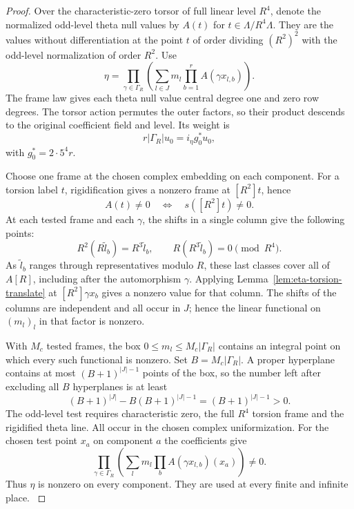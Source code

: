 \begin{proof}
Over the characteristic-zero torsor of full linear level \(R^4\), denote the
normalized odd-level theta null values by \(A(t)\) for
\(t\in\Lambda/R^4\Lambda\). They are the values without differentiation at the point \(t\) of order dividing \((R^2)^2\)
with the odd-level normalization of order \(R^2\). Use
\begin{equation}\label{eq:selected-eta-product}
 \eta=\prod_{\gamma\in\Gamma_R}
             \left(\sum_{l\in J}m_l
                       \prod_{b=1}^{r}A(\gamma x_{l,b})\right).
\end{equation}
The frame law gives each theta null value central degree one
and zero row degrees. The torsor action permutes the outer
factors, so their product descends to the original coefficient
field and level. Its weight is 
\[
  r|\Gamma_R|u_0=i_\eta g_0^*u_0,
\]
with \(g_0^*=2\cdot5^4r\).
\label{cor:selected-auxiliary-cusp-2}

Choose one frame at the chosen complex embedding on each
component. For a torsion label \(t\), rigidification gives a nonzero frame
at \([R^2]t\), hence
\[
 A(t)\ne0\quad\Longleftrightarrow\quad s([R^2]t)\ne0.
\] At each tested frame and each \(\gamma\),
the shifts in a single column give the following points:
\[
  R^2(R\widetilde l_b)=R^3\widetilde l_b,\qquad R(R^3\widetilde l_b)=0\pmod{R^4}.
\]
As \(\widetilde l_b\) ranges through representatives modulo \(R\),
these last classes cover all of \(A[R]\), including after the
automorphism \(\gamma\). Applying Lemma~\ref{lem:eta-torsion-translate}
at \([R^2]\gamma x_b\) gives a nonzero value for that column. The shifts
of the columns are independent and all occur in \(J\); hence the
linear functional on \((m_l)_l\) in that factor is nonzero.

With \(M_c\) tested frames, the box \(0\le m_l\le M_c|\Gamma_R|\)
contains an integral point on which every such functional is
nonzero. Set \(B=M_c|\Gamma_R|\). A proper hyperplane contains at most \((B+1)^{|J|-1}\) points of the box, so the number left after excluding all \(B\) hyperplanes is at least
\[
  (B+1)^{|J|}-B(B+1)^{|J|-1}=(B+1)^{|J|-1}>0.
\]
 The odd-level test requires
characteristic zero, the full \(R^4\) torsion frame and the
rigidified theta line. All occur in the chosen complex uniformization. For the chosen test point \(x_a\) on component \(a\) the coefficients give
\[
 \prod_{\gamma\in\Gamma_R}
   \left(\sum_l m_l\prod_b A(\gamma x_{l,b})(x_a)\right)\ne0.
\]
Thus \(\eta\) is nonzero on every component. They are used at every finite and infinite
place.
\label{cor:selected-auxiliary-cusp-3}


\end{proof}
